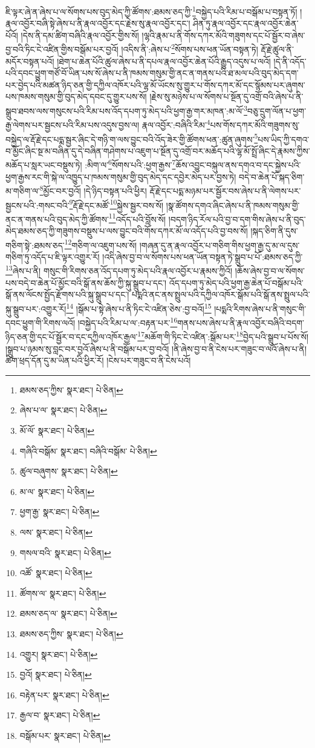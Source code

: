 ཇི་ལྟར་ཞེ་ན་ཞེས་པ་ལ་སོགས་པས་བུད་མེད་ཀྱི་ཚོགས་:ཐམས་ཅད་ཀྱི་\footnote{ཐམས་ཅད་ཀྱིས་  སྣར་ཐང་།  པེ་ཅིན། }བསྐྱེད་པའི་རིམ་པ་བསྒོམ་པ་བསྟན་ཏོ། །རྣལ་འབྱོར་བཞི་སྟེ་ཞེས་པ་ནི་རྣལ་འབྱོར་དང་རྗེས་སུ་རྣལ་འབྱོར་དང་། ཤིན་ཏུ་རྣལ་འབྱོར་དང་རྣལ་འབྱོར་ཆེན་པོའོ། །དེས་ནི་དམ་ཚིག་བཞིའི་རྣལ་འབྱོར་གྱིས་སོ། །ལྷའི་རྣམ་པ་ནི་གོས་དཀར་མོའི་གཟུགས་དང་པོ་སྦྱོར་བ་ཞེས་བྱ་བའི་ཏིང་ངེ་འཛིན་གྱིས་བསྒོམ་པར་བྱའོ། །འདིས་ནི་:ཞེས་པ་\footnote{ཞེས་པ་ལ་  སྣར་ཐང་།  པེ་ཅིན། }སོགས་པས་ཕན་ཡོན་བསྟན་ཏེ། རྡོ་རྗེ་ཚུལ་ནི་མདོར་བསྟན་པའོ། །ཐེག་པ་ཆེན་པོའི་ཚུལ་ཞེས་པ་ནི་དཔལ་རྣལ་འབྱོར་ཆེན་པོའི་རྒྱུད་འདུས་པ་ལའོ། །དེ་ནི་འདོད་པའི་དབང་ཕྱུག་གཙོ་བོ་ཡིན་པས་སོ་ཞེས་པ་ནི་ཁམས་གསུམ་གྱི་ནང་ན་གནས་པའི་ཐ་མལ་པའི་བུད་མེད་དག་པར་བྱེད་པའི་མཚན་ཉིད་ཅན་གྱི་དཀྱིལ་འཁོར་པའི་ལྷ་མོ་ཡོངས་སུ་གྱུར་པ་གོས་དཀར་མོ་དང་སྙོམས་པར་ཞུགས་པས་ཁམས་གསུམ་གྱི་བུད་མེད་དབང་དུ་གྱུར་པས་སོ། །རྗེས་སུ་མཉེས་པ་ལ་སོགས་པ་སྔོན་དུ་འགྲོ་བའི་ཞེས་པ་ནི་སྒྲུབ་ཐབས་ལས་གསུངས་པའི་རིམ་པས་འོད་དཔག་ཏུ་མེད་པའི་ཕྱག་རྒྱ་གར་མཁན་:མ་ལོ་\footnote{མོ་ལོ་  སྣར་ཐང་།  པེ་ཅིན། }བཅུ་དྲུག་ལོན་པ་ཕྱག་རྒྱ་ལེགས་པར་སྦྱངས་པའི་རིམ་པས་འདུས་བྱས་ལ། རྣལ་འབྱོར་:བཞིའི་རིམ་\footnote{གཞིའི་བསྒོམ་  སྣར་ཐང་། བཞིའི་བསྒོམ་  པེ་ཅིན། }པས་གོས་དཀར་མོའི་གཟུགས་སུ་བསྐྱེད་ལ་རྡོ་རྗེ་དང་པདྨ་སྦྱར་ཞིང་དེ་གཉི་ག་ལས་བྱུང་བའི་འོད་ཟེར་གྱི་ཚོགས་ཕན་:ཚུན་ཞུགས་\footnote{ཚུལ་བཞུགས་  སྣར་ཐང་།  པེ་ཅིན། }པས་ཡིད་ཀྱི་དགའ་བ་མྱོང་ཞིང་སྔ་མ་བཞིན་དུ་དེ་བཞིན་གཤེགས་པ་འཇུག་པ་སྔོན་དུ་འགྲོ་བར་མཆོད་པའི་ལྷ་མོ་སྤྲོ་ཞིང་དེ་རྣམས་ཀྱིས་མཆོད་པ་སླར་ཡང་བསྡུས་ཏེ། :མིག་ལ་\footnote{མ་ལ་  སྣར་ཐང་།  པེ་ཅིན། }སོགས་པའི་:ཕྱག་རྒྱས་\footnote{ཕྱག་རྒྱ་  སྣར་ཐང་།  པེ་ཅིན། }ཆོས་འབྱུང་བསྐུལ་ནས་དགའ་བ་དང་སྐྱེས་པའི་ཕྱག་རྒྱས་རང་གི་སྐེ་ལ་འཁྱུད་པ་ཁམས་གསུམ་གྱི་བུད་མེད་དང་དབྱེར་མེད་པར་བྱས་ཏེ། བདེ་བ་ཆེན་པོ་སྐད་ཅིག་མ་གཅིག་ལ་\footnote{ལས་  སྣར་ཐང་།  པེ་ཅིན། }མྱོང་བར་བྱའོ། །དེ་ཉིད་བསྟན་པའི་ཕྱིར། རྡོ་རྗེ་དང་པདྨ་མཉམ་པར་སྦྱོར་བས་ཞེས་པ་ནི་ལེགས་པར་སྦྱངས་པའི་:གསང་བའི་\footnote{གསལ་བའི་  སྣར་ཐང་།  པེ་ཅིན། }རྡོ་རྗེ་དང་མཚོ་\footnote{འཚོ་  སྣར་ཐང་།  པེ་ཅིན། }སྐྱེས་སྦྱར་བས་སོ། །སྣ་ཚོགས་དགའ་ཞིང་ཞེས་པ་ནི་ཁམས་གསུམ་གྱི་ནང་ན་གནས་པའི་བུད་མེད་ཀྱི་ཚོགས་\footnote{ཚོགས་ལ་  སྣར་ཐང་།  པེ་ཅིན། }འདོད་པའི་བློས་སོ། །བདག་ཉིད་རོལ་པའི་བྱ་བ་དག་གིས་ཞེས་པ་ནི་བུད་མེད་ཐམས་ཅད་ཀྱི་གཟུགས་བསྡུས་པ་ལས་བྱུང་བའི་གོས་དཀར་མོ་ལ་འདོད་པའི་བྱ་བས་སོ། །སྐད་ཅིག་ནི་དུས་གཅིག་སྟེ་:ཐམས་ཅད་\footnote{ཐམས་ཅད་ལ་  སྣར་ཐང་།  པེ་ཅིན། }གཅིག་ལ་འཇུག་པས་སོ། །གཞན་དུ་ན་རྣལ་འབྱོར་པ་གཅིག་གིས་ཕྱག་རྒྱ་དུ་མ་ལ་དུས་གཅིག་ཏུ་འདོད་པ་ཇི་ལྟར་འགྱུར་རོ། །འདི་ཞེས་བྱ་བ་ལ་སོགས་པས་ཕན་ཡོན་བསྟན་ཏེ་སྒྲུབ་པ་པོ་:ཐམས་ཅད་ཀྱི་\footnote{ཐམས་ཅད་ཀྱིས་  སྣར་ཐང་།  པེ་ཅིན། }ཞེས་པ་ནི། གསུང་གི་རིགས་ཅན་འོད་དཔག་ཏུ་མེད་པའི་རྣལ་འབྱོར་པ་རྣམས་ཀྱིའོ། །ཆོས་ཞེས་བྱ་བ་ལ་སོགས་པས་བདེ་བ་ཆེན་པོ་མྱོང་བའི་སྒོ་ནས་ཆོས་ཀྱི་སྐུ་སྒྲུབ་པ་དང་། འོད་དཔག་ཏུ་མེད་པའི་ཕྱག་རྒྱ་ཆེན་པོ་བསྒོམ་པའི་སྒོ་ནས་ལོངས་སྤྱོད་རྫོགས་པའི་སྐུ་སྒྲུབ་པ་དང་། པདྨའི་ནང་ནས་སྤྲུལ་པའི་དཀྱིལ་འཁོར་སྒོམ་པའི་སྒོ་ནས་སྤྲུལ་པའི་སྐུ་སྒྲུབ་པར་:འགྱུར་རོ།\footnote{འགྱུར།  སྣར་ཐང་།  པེ་ཅིན། } །སྒོམ་པ་སྟེ་ཞེས་པ་ནི་ཏིང་ངེ་འཛིན་ཅེས་:བྱ་བའོ།\footnote{བྱའོ།  སྣར་ཐང་།  པེ་ཅིན། } །པདྨའི་རིགས་ཞེས་པ་ནི་གསུང་གི་དབང་ཕྱུག་གི་རིགས་ལའོ། །བསྐྱེད་པའི་རིམ་པ་ལ་:བརྟན་པར་\footnote{བརྟེན་པར་  སྣར་ཐང་།  པེ་ཅིན། }གནས་པས་ཞེས་པ་ནི་རྣལ་འབྱོར་བཞིའི་བདག་ཉིད་ཅན་གྱི་དང་པོ་སྦྱོར་བ་དང་དཀྱིལ་འཁོར་རྒྱལ་\footnote{རྒྱལ་བ་  སྣར་ཐང་།  པེ་ཅིན། }མཆོག་གི་ཏིང་ངེ་འཛིན་:སྒོམ་པར་\footnote{བསྒོམ་པར་  སྣར་ཐང་།  པེ་ཅིན། }བྱེད་པའི་སྒྲུབ་པ་པོས་སོ། །སྒྲུབ་པ་ཉམས་སུ་བླང་བར་བྱའོ་ཞེས་པ་ནི་བསྒོམ་པར་བྱ་བའོ། །ནི་ཞེས་བྱ་བ་ནི་ངེས་པར་གཟུང་བ་ལའོ་ཞེས་པ་ནི། ཚིག་ཕྲད་དོན་དུ་མ་ཡིན་པའི་ཕྱིར་རོ། །ངེས་པར་གཟུང་བ་ནི་ངེས་པའོ། 